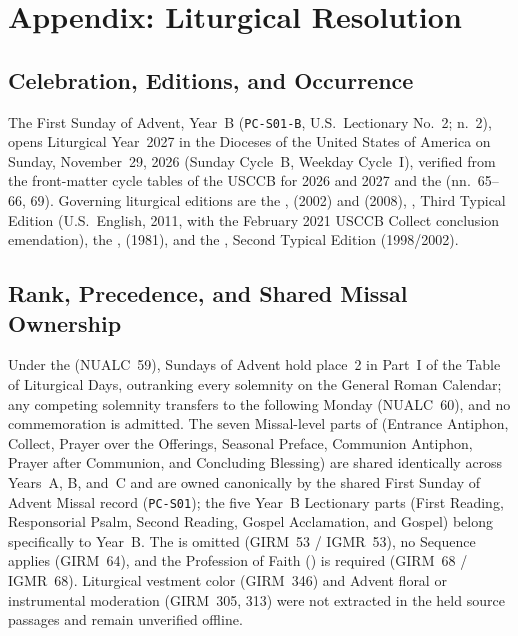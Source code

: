 \section{Appendix: Liturgical Resolution}

\subsection{Celebration, Editions, and Occurrence}
The First Sunday of Advent, Year~B (\texttt{PC-S01-B}, U.S.\ Lectionary No.~2;  n.~2), opens Liturgical Year~2027 in the Dioceses of the United States of America on Sunday, November~29, 2026 (Sunday Cycle~B, Weekday Cycle~I), verified from the front-matter cycle tables of the USCCB  for 2026 and 2027 and the   (nn.~65--66, 69). Governing liturgical editions are the ,  (2002) and  (2008), , Third Typical Edition (U.S.\ English, 2011, with the February 2021 USCCB Collect conclusion emendation), the ,  (1981), and the , Second Typical Edition (1998/2002).

\subsection{Rank, Precedence, and Shared Missal Ownership}
Under the  (NUALC~59), Sundays of Advent hold place~2 in Part~I of the Table of Liturgical Days, outranking every solemnity on the General Roman Calendar; any competing solemnity transfers to the following Monday (NUALC~60), and no commemoration is admitted. The seven Missal-level parts of  (Entrance Antiphon, Collect, Prayer over the Offerings, Seasonal Preface, Communion Antiphon, Prayer after Communion, and Concluding Blessing) are shared identically across Years~A, B, and~C and are owned canonically by the shared First Sunday of Advent Missal record (\texttt{PC-S01}); the five Year~B Lectionary parts (First Reading, Responsorial Psalm, Second Reading, Gospel Acclamation, and Gospel) belong specifically to Year~B. The  is omitted (GIRM~53 / IGMR~53), no Sequence applies (GIRM~64), and the Profession of Faith () is required (GIRM~68 / IGMR~68). Liturgical vestment color (GIRM~346) and Advent floral or instrumental moderation (GIRM~305, 313) were not extracted in the held source passages and remain unverified offline.

